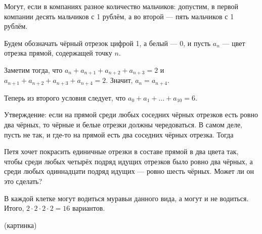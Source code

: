 \begin{itemize}
\itA Могут, если в компаниях разное количество мальчиков: допустим, в первой компании десять мальчиков с 1 рублём, а во второй --- пять мальчиков с 1 рублём.

\itB 

Будем обозначать чёрный отрезок цифрой 1, а белый --- 0, и пусть $a_n$ --- цвет отрезка прямой, содержащей
точку $n$.

Заметим тогда, что $a_n+a_{n+1}+a_{n+2}+a_{n+3} = 2$ и $a_{n+1}+a_{n+2}+a_{n+3}+a_{n+4} = 2$. 
Значит, $a_n = a_{n+4}$. 

Теперь из второго условия следует, что $a_0+a_1+\dots+a_10 = 6$. 



Утверждение: если на прямой среди любых соседних чёрных отрезков есть ровно два чёрных, то чёрные и белые отрезки
должны чередоваться. В самом деле, пусть не так, и где-то на прямой есть два соседних чёрных отрезка. 
Тогда 


Петя хочет покрасить единичные отрезки в составе прямой в два цвета так, чтобы среди любых четырёх подряд идущих отрезков было ровно два чёрных, а среди любых одиннадцати подряд идущих — ровно шесть чёрных. Может ли он это сделать?

\itC В каждой клетке могут водиться муравьи данного вида, а могут и не водиться. Итого, $2 \cdot 2 \cdot 2 \cdot 2 = 16$ вариантов. 

(картинка)
\end{itemize}
